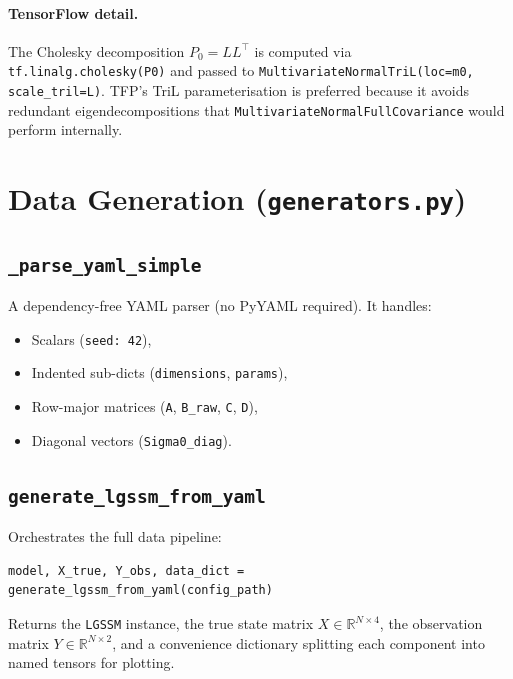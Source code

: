 \documentclass[11pt,a4paper]{article}
\newcommand{\py}[1]{\lstinline[style=py]{#1}}
\newcommand{\file}[1]{\texttt{#1}}
\begin{document}
\paragraph{TensorFlow detail.}
The Cholesky decomposition $P_0 = LL^\top$ is computed via
\py{tf.linalg.cholesky(P0)} and passed to
\py{MultivariateNormalTriL(loc=m0, scale_tril=L)}.  TFP's TriL
parameterisation is preferred because it avoids redundant
eigendecompositions that \py{MultivariateNormalFullCovariance} would
perform internally.


\section{Data Generation (\file{generators.py})}

\subsection{\py{_parse_yaml_simple}}

A dependency-free YAML parser (no PyYAML required).  It handles:
\begin{itemize}
\item Scalars (\py{seed: 42}),
\item Indented sub-dicts (\py{dimensions}, \py{params}),
\item Row-major matrices (\py{A}, \py{B_raw}, \py{C}, \py{D}),
\item Diagonal vectors (\py{Sigma0_diag}).
\end{itemize}

\subsection{\py{generate_lgssm_from_yaml}}

Orchestrates the full data pipeline:

\begin{lstlisting}[caption={Data generation entry point.}]
model, X_true, Y_obs, data_dict = generate_lgssm_from_yaml(config_path)
\end{lstlisting}

Returns the \py{LGSSM} instance, the true state matrix
$X \in \mathbb{R}^{N \times 4}$, the observation matrix
$Y \in \mathbb{R}^{N \times 2}$, and a convenience dictionary
splitting each component into named tensors for plotting.
\end{document}
